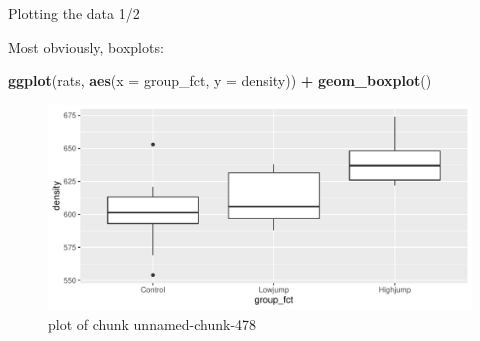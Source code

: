 \documentclass[
  ignorenonframetext,
]{beamer}
\newenvironment{Shaded}{\begin{snugshade}}{\end{snugshade}}
\newcommand{\DataTypeTok}[1]{\textcolor[rgb]{0.13,0.29,0.53}{#1}}
\newcommand{\KeywordTok}[1]{\textcolor[rgb]{0.13,0.29,0.53}{\textbf{#1}}}
\newcommand{\NormalTok}[1]{#1}
\newcommand{\OperatorTok}[1]{\textcolor[rgb]{0.81,0.36,0.00}{\textbf{#1}}}
\newcommand{\StringTok}[1]{\textcolor[rgb]{0.31,0.60,0.02}{#1}}
\begin{document}
\begin{frame}[fragile]{Plotting the data 1/2}
\protect\hypertarget{plotting-the-data-12}{}

Most obviously, boxplots:

\begin{Shaded}
\begin{Highlighting}[]
\KeywordTok{ggplot}\NormalTok{(rats, }\KeywordTok{aes}\NormalTok{(}\DataTypeTok{x =}\NormalTok{ group_fct, }\DataTypeTok{y =}\NormalTok{ density)) }\OperatorTok{+}\StringTok{ }\KeywordTok{geom_boxplot}\NormalTok{()}
\end{Highlighting}
\end{Shaded}

\begin{figure}
\centering
\includegraphics{figure/unnamed-chunk-478-1.pdf}
\caption{plot of chunk unnamed-chunk-478}
\end{figure}

\end{frame}
\end{document}
